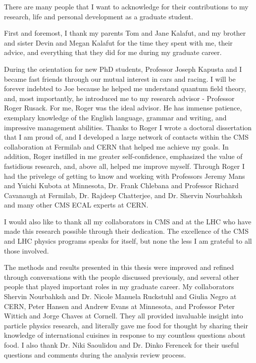 
There are many people that I want to acknowledge for their contributions to my research, life and personal development 
as a graduate student.

First and foremost, I thank my parents Tom and Jane Kalafut, and my brother and sister Devin and Megan Kalafut for 
the time they spent with me, their advice, and everything that they did for me during my graduate career.

During the orientation for new PhD students, Professor Joseph Kapusta and I became fast friends 
through our mutual interest in cars and racing.  I will be forever indebted to Joe because he helped me understand quantum 
field theory, and, most importantly, he introduced me to my research advisor - Professor Roger Rusack.  For me, Roger 
was the ideal advisor.  He has immense patience, exemplary knowledge of the English language, grammar and writing, and 
impressive management abilities.  Thanks to Roger I wrote a doctoral dissertation that I am proud of, and I developed a 
large network of contacts within the CMS collaboration at Fermilab and CERN that helped me achieve my goals.  In addition, 
Roger instilled in me greater self-confidence, emphasized the value of fastidious research, and, above all, helped me 
improve myself.  Through Roger I had the privelege of getting to know and working with Professors Jeremy Mans and Yuichi 
Kubota at Minnesota, Dr. Frank Chlebana and Professor Richard Cavanaugh at Fermilab, Dr. Rajdeep Chatterjee, and Dr. Shervin 
Nourbahksh and many other CMS ECAL experts at CERN.  

I would also like to thank all my collaborators in CMS and at the LHC who have made this research possible through their 
dedication. The excellence of the CMS and LHC physics programs speaks for itself, but none the less I am grateful to all those
involved.

The methods and results presented in this thesis were improved and refined through conversations with the people discussed 
previously, and several other people that played important roles in my graduate career.  My collaborators Shervin Nourbahksh 
and Dr. Nicole Manuela Ruckstuhl and Giulia Negro at CERN, Peter Hansen and Andrew Evans at Minnesota, and Professor Peter 
Wittich and Jorge Chaves at Cornell.  They all provided invaluable insight into particle physics research, and literally 
gave me food for thought by sharing their knowledge of international cuisines in response to my countless questions about 
food.  I also thank Dr. Niki Saoulidou and Dr. Dinko Ferencek for their useful questions and comments during the analysis 
review process.


